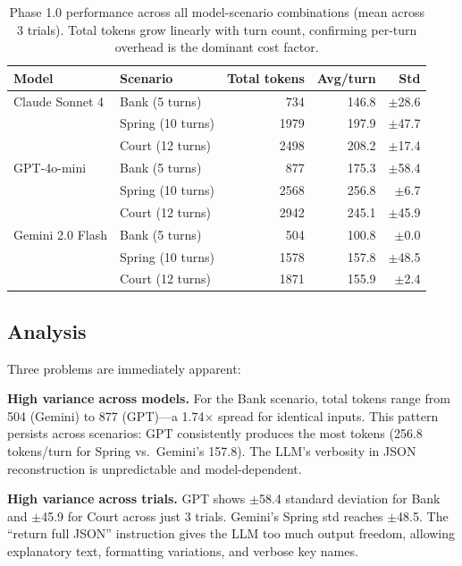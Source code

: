 \documentclass[11pt,a4paper]{article}
\begin{document}
\begin{table}[ht]
\centering
\begin{tabular}{llrrr}
\toprule
\textbf{Model} & \textbf{Scenario} & \textbf{Total tokens} & \textbf{Avg/turn} & \textbf{Std} \\
\midrule
Claude Sonnet 4 & Bank (5 turns) & 734 & 146.8 & $\pm$28.6 \\
                & Spring (10 turns) & 1979 & 197.9 & $\pm$47.7 \\
                & Court (12 turns) & 2498 & 208.2 & $\pm$17.4 \\
\midrule
GPT-4o-mini     & Bank (5 turns) & 877 & 175.3 & $\pm$58.4 \\
                & Spring (10 turns) & 2568 & 256.8 & $\pm$6.7 \\
                & Court (12 turns) & 2942 & 245.1 & $\pm$45.9 \\
\midrule
Gemini 2.0 Flash & Bank (5 turns) & 504 & 100.8 & $\pm$0.0 \\
                  & Spring (10 turns) & 1578 & 157.8 & $\pm$48.5 \\
                  & Court (12 turns) & 1871 & 155.9 & $\pm$2.4 \\
\bottomrule
\end{tabular}
\caption{Phase 1.0 performance across all model-scenario combinations (mean across 3 trials).
Total tokens grow linearly with turn count, confirming per-turn overhead is the dominant cost factor.}
\label{tab:phase1_0}
\end{table}

\subsection{Analysis}

Three problems are immediately apparent:

\textbf{High variance across models.} For the Bank scenario, total tokens range from 504 (Gemini) to
877 (GPT)---a 1.74$\times$ spread for identical inputs. This pattern persists across scenarios:
GPT consistently produces the most tokens (256.8 tokens/turn for Spring vs.\ Gemini's 157.8).
The LLM's verbosity in JSON reconstruction is unpredictable and model-dependent.

\textbf{High variance across trials.} GPT shows $\pm$58.4 standard deviation for Bank
and $\pm$45.9 for Court across just 3 trials. Gemini's Spring std reaches $\pm$48.5.
The ``return full JSON'' instruction gives the LLM too much output freedom, allowing
explanatory text, formatting variations, and verbose key names.
\end{document}
